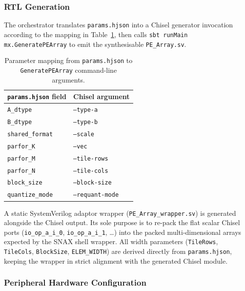 \subsubsection{RTL Generation}
\label{sec:integration:hw:rtl}

The orchestrator translates \texttt{params.hjson} into a Chisel
generator invocation according to the mapping in
Table~\ref{tab:chisel_map}, then calls
\texttt{sbt runMain mx.GeneratePEArray} to emit the synthesisable
\texttt{PE\_Array.sv}.

\begin{table}[h]
\centering
\caption{Parameter mapping from \texttt{params.hjson} to
         \texttt{GeneratePEArray} command-line arguments.}
\label{tab:chisel_map}
\begin{tabular}{ll}
\toprule
\texttt{params.hjson} field & Chisel argument \\
\midrule
\texttt{A\_dtype}       & \texttt{--type-a}      \\
\texttt{B\_dtype}       & \texttt{--type-b}      \\
\texttt{shared\_format} & \texttt{--scale}       \\
\texttt{parfor\_K}      & \texttt{--vec}         \\
\texttt{parfor\_M}      & \texttt{--tile-rows}   \\
\texttt{parfor\_N}      & \texttt{--tile-cols}   \\
\texttt{block\_size}    & \texttt{--block-size}  \\
\texttt{quantize\_mode} & \texttt{--requant-mode}\\
\bottomrule
\end{tabular}
\end{table}

A static SystemVerilog adaptor wrapper (\texttt{PE\_Array\_wrapper.sv})
is generated alongside the Chisel output.  Its sole purpose is to
re-pack the flat scalar Chisel ports
(\texttt{io\_op\_a\_i\_0}, \texttt{io\_op\_a\_i\_1}, \ldots) into
the packed multi-dimensional arrays expected by the SNAX shell wrapper.
All width parameters (\texttt{TileRows}, \texttt{TileCols},
\texttt{BlockSize}, \texttt{ELEM\_WIDTH}) are derived directly from
\texttt{params.hjson}, keeping the wrapper in strict alignment with the
generated Chisel module.

\subsubsection{Peripheral Hardware Configuration}
\label{sec:integration:hw:cfg}


